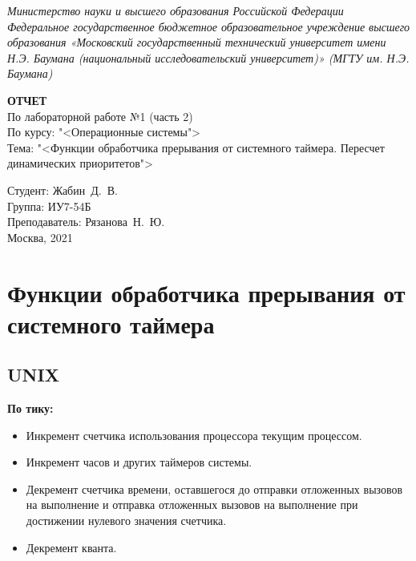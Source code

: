 \documentclass[a4paper,oneside,14pt]{extreport}
\begin{document}
	
	\begin{titlepage}
		\centering
		
		{\footnotesize \itshape Министерство науки и высшего образования Российской Федерации\\
			Федеральное государственное бюджетное образовательное учреждение 
			высшего образования
			«Московский государственный технический университет
			имени Н.Э. Баумана
			(национальный исследовательский университет)»
			(МГТУ им. Н.Э. Баумана)\\}
		
		\vspace{60mm}
		
		\textbf{ОТЧЕТ}\\
		По лабораторной работе №1 (часть 2)\\
		По курсу: "<Операционные системы">\\
		Тема: "<Функции обработчика прерывания от системного таймера. Пересчет динамических приоритетов">\\
		
		\vspace{60mm}
		
		\hspace{70mm} Студент:
		\hfill Жабин~Д.~В.\\
		\hspace{70mm} Группа:
		\hfill ИУ7-54Б\\
		\hspace{70mm} Преподаватель:
		\hfill Рязанова~Н.~Ю.\\
		
		\vfill
		Москва, 2021
	\end{titlepage}
	
	\chapter{Функции обработчика прерывания от системного таймера}
	
	\section{UNIX}
	
	\textbf{По тику:}
	\begin{itemize}
		\item Инкремент счетчика использования процессора текущим процессом.
		\item Инкремент часов и других таймеров системы.
		\item Декремент счетчика времени, оставшегося до отправки отложенных вызовов на выполнение и отправка отложенных вызовов на выполнение при достижении нулевого значения счетчика.
		\item Декремент кванта.
	\end{itemize}
	
\end{document}
